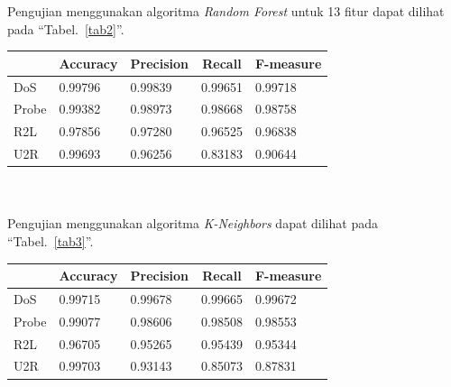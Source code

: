 \documentclass[conference]{IEEEtran}
\begin{document}
\noindent Pengujian menggunakan algoritma \emph{Random Forest} untuk 13 fitur dapat dilihat pada ``Tabel.~\ref{tab2}''.\\

\begin{minipage}{\linewidth}
\begin{center}
\begin{tabular}{|l|l|l|l|l|}
\hline
\multicolumn{1}{|c|}{\textbf{}}&\multicolumn{1}{|c|}{\textbf{Accuracy}}&\multicolumn{1}{|c|}{\textbf{Precision}}&\multicolumn{1}{|c|}{\textbf{Recall}}&\multicolumn{1}{|c|}{\textbf{F-measure}} \\
\hline
DoS & 0.99796 & 0.99839 & 0.99651 & 0.99718\\
\hline
Probe & 0.99382 & 0.98973 & 0.98668 & 0.98758\\
\hline
R2L & 0.97856 & 0.97280 & 0.96525 & 0.96838\\
\hline
U2R & 0.99693 & 0.96256 & 0.83183 & 0.90644\\
\hline
\end{tabular}
\label{tab2}
\end{center}
\end{minipage}\\ \\

\noindent Pengujian menggunakan algoritma \emph{K-Neighbors} dapat dilihat pada ``Tabel.~\ref{tab3}''.\\

\begin{minipage}{\linewidth}
\begin{center}
\begin{tabular}{|l|l|l|l|l|}
\hline
\multicolumn{1}{|c|}{\textbf{}}&\multicolumn{1}{|c|}{\textbf{Accuracy}}&\multicolumn{1}{|c|}{\textbf{Precision}}&\multicolumn{1}{|c|}{\textbf{Recall}}&\multicolumn{1}{|c|}{\textbf{F-measure}} \\
\hline
DoS & 0.99715 & 0.99678 & 0.99665 & 0.99672\\
\hline
Probe & 0.99077 & 0.98606 & 0.98508 & 0.98553\\
\hline
R2L & 0.96705 & 0.95265 & 0.95439 & 0.95344\\
\hline
U2R & 0.99703 & 0.93143 & 0.85073 & 0.87831\\
\hline
\end{tabular}
\label{tab3}
\end{center}
\end{minipage}\\ \\
\end{document}
